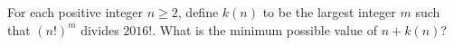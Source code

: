For each positive integer $n\ge 2$, define $k\left(n\right)$ to be the largest integer $m$ such that $\left(n!\right)^m$ divides $2016!$. What is the minimum possible value of $n+k\left(n\right)$?
